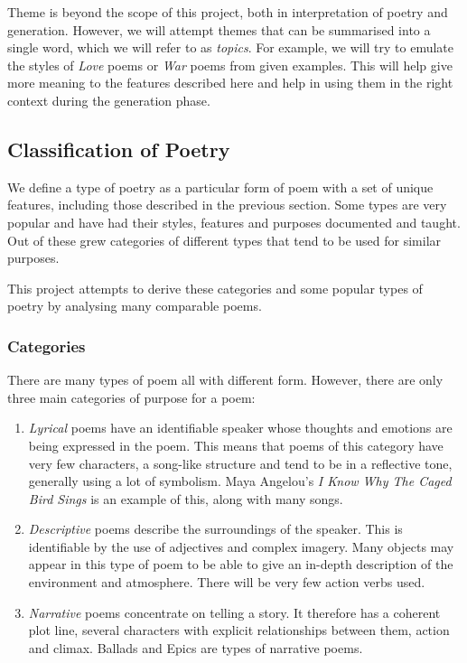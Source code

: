 Theme is beyond the scope of this project, both in interpretation of poetry and generation. However, we will attempt themes that can be summarised into a single word, which we will refer to as \textit{topics}. For example, we will try to emulate the styles of \textit{Love} poems or \textit{War} poems from given examples. This will help give more meaning to the features described here and help in using them in the right context during the generation phase.

\subsection{Classification of Poetry}

We define a type of poetry as a particular form of poem with a set of unique features, including those described in the previous section. Some types are very popular and have had their styles, features and purposes documented and taught. Out of these grew categories of different types that tend to be used for similar purposes.

This project attempts to derive these categories and some popular types of poetry by analysing many comparable poems.

\subsubsection{Categories}

There are many types of poem all with different form. However, there are only three main categories of purpose for a poem:

\begin{enumerate}
\item{\textit{Lyrical} poems have an identifiable speaker whose thoughts and emotions are being expressed in the poem. This means that poems of this category have very few characters, a song-like structure and tend to be in a reflective tone, generally using a lot of symbolism. Maya Angelou's \textit{I Know Why The Caged Bird Sings} is an example of this, along with many songs.}
\item{\textit{Descriptive} poems describe the surroundings of the speaker. This is identifiable by the use of adjectives and complex imagery. Many objects may appear in this type of poem to be able to give an in-depth description of the environment and atmosphere. There will be very few action verbs used.}
\item{\textit{Narrative} poems concentrate on telling a story. It therefore has a coherent plot line, several characters with explicit relationships between them, action and climax. Ballads and Epics are types of narrative poems.}
\end{enumerate}


